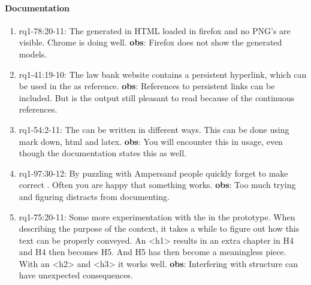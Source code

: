 \paragraph{Documentation}
\begin{enumerate}
    \item rq1-78:20-11: The  generated in HTML loaded in firefox and no PNG's are visible.
    Chrome is doing well.
    \newline\textbf{obs}: Firefox does not show the generated models.

    \item rq1-41:19-10: The law bank website contains a persistent hyperlink, which can be used in the  as reference.
    \newline\textbf{obs}: References to persistent links can be included.
    But is the output still pleasant to read because of the continuous references.

    \item rq1-54:2-11: The  can be written in different ways.
    This can be done using mark down, html and latex.
    \newline\textbf{obs}: You will encounter this in usage, even though the documentation states this as well.

    \item rq1-97:30-12: By puzzling with Ampersand people quickly forget to make correct .
    Often you are happy that something works.
    \newline\textbf{obs}: Too much trying and figuring distracts from documenting.

    \item rq1-75:20-11: Some more experimentation with the  in the prototype.
    When describing the purpose of the context, it takes a while to figure out how this text can be properly conveyed.
    An <h1> results in an extra chapter in H4 and H4 then becomes H5. And H5 has then become a meaningless piece.
    With an <h2> and <h3> it works well.
    \newline\textbf{obs}: Interfering with structure can have unexpected consequences.

\end{enumerate}

